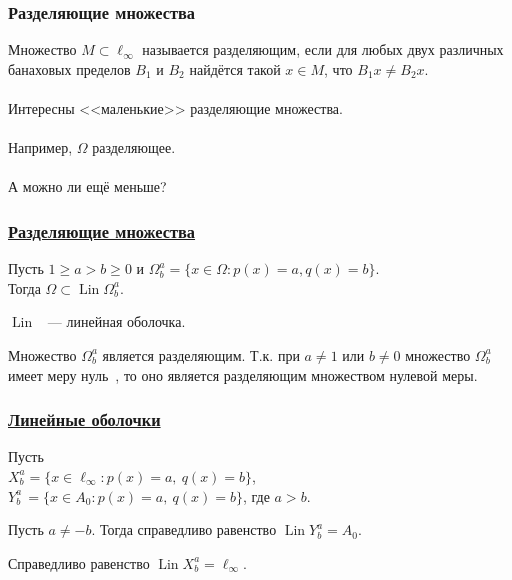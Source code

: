 \begin{frame}\frametitle{Разделяющие множества}
	Множество $M\subset \ell_\infty$ называется разделяющим,
	если для любых двух различных банаховых пределов $B_1$ и $B_2$
	найдётся такой $x\in M$, что $B_1 x \ne B_2 x$.
	\\~\\
	Интересны <<маленькие>> разделяющие множества.
	\\~\\
	Например, $\Omega$ разделяющее.
	\\~\\
	А можно ли ещё меньше?
\end{frame}


\begin{frame}\frametitle{\underline{Разделяющие множества}}

	\begin{ttheorem}
		Пусть
		$1 \geq a > b \geq 0$ и
		$\Omega^a_b = \{x\in\Omega : p(x) = a, q(x) = b\}$.
		\\
		Тогда $\Omega \subset \operatorname{Lin} \Omega^a_b$.
	\end{ttheorem}

	\vfill
	$\operatorname{Lin}$ ~--- линейная оболочка.
	\vfill
	\begin{ttheorem}
		Множество $\Omega^a_b$ является разделяющим.
		Т.к. при $a\neq 1$ или $b\neq 0$ множество $\Omega^a_b$ имеет меру нуль~\cite{semenov2010characteristic,connor1990almost},
		то оно является разделяющим множеством нулевой меры.
	\end{ttheorem}
\end{frame}


\begin{frame}\frametitle{\underline{Линейные оболочки}}

	Пусть
	\\
	$X^a_b = \{x\in\ell_\infty : p(x) = a,~ q(x) = b\}$,
	\\
	$Y^a_b\, = \{x\in A_0 : p(x) = a,~ q(x) = b\}$, где $a>b$.
	\vfill
	\begin{ttheorem}
		Пусть $a\neq -b$.
		Тогда справедливо равенство $\operatorname{Lin} Y^a_b = A_0$.
	\end{ttheorem}
	\vfill
	\begin{ttheorem}
		Справедливо равенство $\operatorname{Lin} X^a_b = \ell_\infty$.
	\end{ttheorem}

\end{frame}



